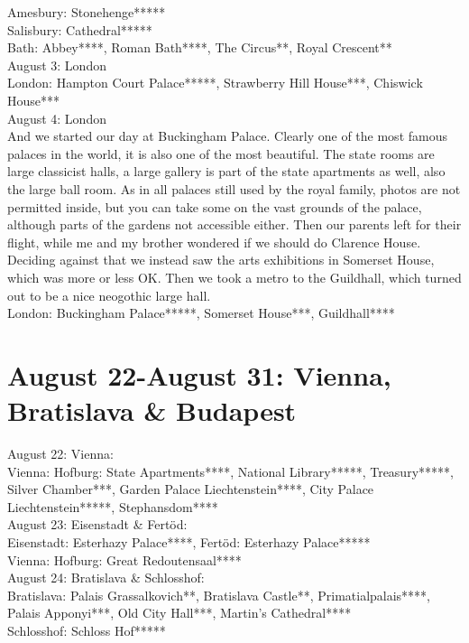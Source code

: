 Amesbury: Stonehenge*****\\
Salisbury: Cathedral*****\\
Bath: Abbey****, Roman Bath****, The Circus**, Royal Crescent**\\

August 3: London\\
London: Hampton Court Palace*****, Strawberry Hill House***, Chiswick House***\\

August 4: London\\
And we started our day at Buckingham Palace. Clearly one of the most famous palaces in the world, it is also one of the most beautiful. The state rooms are large classicist halls, a large gallery is part of the state apartments as well, also the large ball room. As in all palaces still used by the royal family, photos are not permitted inside, but you can take some on the vast grounds of the palace, although parts of the gardens not accessible either. Then our parents left for their flight, while me and my brother wondered if we should do Clarence House. Deciding against that we instead saw the arts exhibitions in Somerset House, which was more or less OK. Then we took a metro to the Guildhall, which turned out to be a nice neogothic large hall.\\

London: Buckingham Palace*****, Somerset House***, Guildhall****\\

\section{August 22-August 31: Vienna, Bratislava \& Budapest}
\label{austria2014}

August 22: Vienna:\\
Vienna: Hofburg: State Apartments****, National Library*****, Treasury*****, Silver Chamber***, Garden Palace Liechtenstein****, City Palace Liechtenstein*****, Stephansdom****\\

August 23: Eisenstadt \& Fert\"od:\\
Eisenstadt: Esterhazy Palace****, Fert\"od: Esterhazy Palace*****\\
Vienna: Hofburg: Great Redoutensaal****\\

August 24: Bratislava \& Schlosshof:\\
Bratislava: Palais Grassalkovich**, Bratislava Castle**, Primatialpalais****, Palais Apponyi***, Old City Hall***, Martin's Cathedral****\\
Schlosshof: Schloss Hof*****\\

